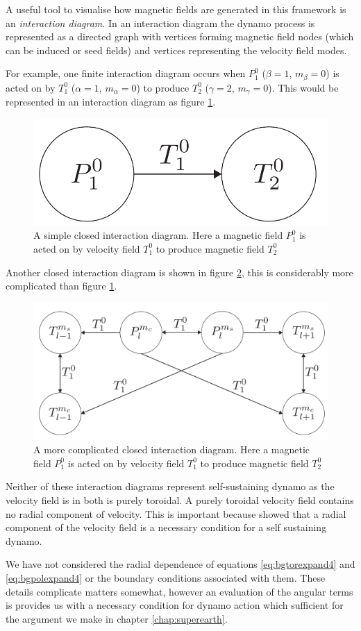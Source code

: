 A useful tool to visualise how magnetic fields are generated in this framework is an \emph{interaction diagram}. In an interaction diagram the dynamo process is represented as a directed graph with vertices forming magnetic field nodes (which can be induced or seed fields) and vertices representing the velocity field modes. 

For example, one finite interaction diagram occurs when $P_1^0$ ($\beta=1$, $m_\beta=0$) is acted on by $T_1^0$ ($\alpha=1$, $m_\alpha=0$) to produce $T_2^0$ ($\gamma=2$, $m_\gamma=0$). This would be represented in an interaction diagram as figure \ref{fig:interaction-differentialrotation}.
\begin{figure}
	\centering
	\noindent\includegraphics[width=.45\linewidth]{Appendix1/figures/interaction-differentialrotation.pdf}
	\caption{A simple closed interaction diagram. Here a magnetic field $P_1^0$ is acted on by velocity field $T_1^0$ to produce magnetic field $T_2^0$}
	\label{fig:interaction-differentialrotation}
\end{figure}
Another closed interaction diagram is shown in figure \ref{interaction-complicated.pdf}, this is considerably more complicated than figure \ref{fig:interaction-differentialrotation}.
\begin{figure}
	\centering
	\noindent\includegraphics[width=\linewidth]{Appendix1/figures/interaction-complicated.pdf}
	\caption{A more complicated closed interaction diagram. Here a magnetic field $P_1^0$ is acted on by velocity field $T_1^0$ to produce magnetic field $T_2^0$}
	\label{interaction-complicated.pdf}
\end{figure}
Neither of these interaction diagrams represent self-sustaining dynamo as the velocity field is in both is purely toroidal. A purely toroidal velocity field contains no radial component of velocity. This is important because \citet{busse1975} showed that a radial component of the velocity field is a necessary condition for a self sustaining dynamo. 

We have not considered the radial dependence of equations \ref{eq:bgtorexpand4} and \ref{eq:bgpolexpand4} or the boundary conditions associated with them. These details complicate matters somewhat, however an evaluation of the angular terms is provides us with a necessary condition for dynamo action which sufficient for the argument we make in chapter \ref{chap:superearth}.
